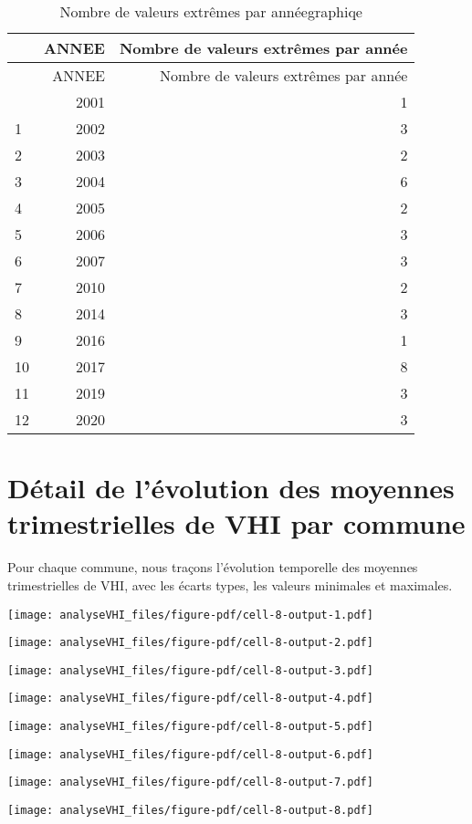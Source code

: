 \documentclass[
  10pt,
  letterpaper,
  DIV=11,
  numbers=noendperiod]{scrartcl}
\begin{document}
\begin{longtable}[]{@{}lrr@{}}
\caption{Nombre de valeurs extrêmes par annéegraphiqe}\tabularnewline
\toprule\noalign{}
& ANNEE & Nombre de valeurs extrêmes par année \\
\midrule\noalign{}
\endfirsthead
\toprule\noalign{}
& ANNEE & Nombre de valeurs extrêmes par année \\
\midrule\noalign{}
\endhead
\bottomrule\noalign{}
\endlastfoot
0 & 2001 & 1 \\
1 & 2002 & 3 \\
2 & 2003 & 2 \\
3 & 2004 & 6 \\
4 & 2005 & 2 \\
5 & 2006 & 3 \\
6 & 2007 & 3 \\
7 & 2010 & 2 \\
8 & 2014 & 3 \\
9 & 2016 & 1 \\
10 & 2017 & 8 \\
11 & 2019 & 3 \\
12 & 2020 & 3 \\
\end{longtable}

\section{Détail de l'évolution des moyennes trimestrielles de VHI par
commune}\label{duxe9tail-de-luxe9volution-des-moyennes-trimestrielles-de-vhi-par-commune}

Pour chaque commune, nous traçons l'évolution temporelle des moyennes
trimestrielles de VHI, avec les écarts types, les valeurs minimales et
maximales.

\texttt{[image: analyseVHI\_files/figure-pdf/cell-8-output-1.pdf]}

\texttt{[image: analyseVHI\_files/figure-pdf/cell-8-output-2.pdf]}

\texttt{[image: analyseVHI\_files/figure-pdf/cell-8-output-3.pdf]}

\texttt{[image: analyseVHI\_files/figure-pdf/cell-8-output-4.pdf]}

\texttt{[image: analyseVHI\_files/figure-pdf/cell-8-output-5.pdf]}

\texttt{[image: analyseVHI\_files/figure-pdf/cell-8-output-6.pdf]}

\texttt{[image: analyseVHI\_files/figure-pdf/cell-8-output-7.pdf]}

\texttt{[image: analyseVHI\_files/figure-pdf/cell-8-output-8.pdf]}
\end{document}
